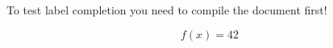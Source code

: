 \documentclass{article}
\begin{document}
To test label completion you need to compile the document first!

\begin{equation}
  f(x) = 42
  \label{eq:main-is-working}
\end{equation}






\end{document}
